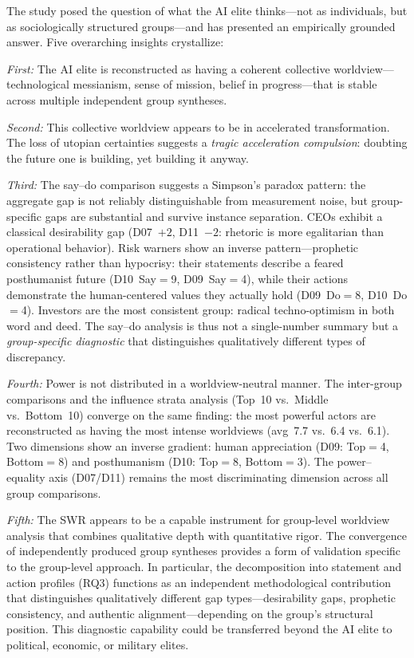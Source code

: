 \documentclass[12pt,a4paper]{article}
\begin{document}
The study posed the question of what the AI elite thinks---not as individuals, but as sociologically structured groups---and has presented an empirically grounded answer. Five overarching insights crystallize:

\emph{First:} The AI elite is reconstructed as having a coherent collective worldview---technological messianism, sense of mission, belief in progress---that is stable across multiple independent group syntheses.

\emph{Second:} This collective worldview appears to be in accelerated transformation. The loss of utopian certainties suggests a \emph{tragic acceleration compulsion}: doubting the future one is building, yet building it anyway.

\emph{Third:} The say--do comparison suggests a Simpson's paradox pattern: the aggregate gap is not reliably distinguishable from measurement noise, but group-specific gaps are substantial and survive instance separation. CEOs exhibit a classical desirability gap (D07~$+2$, D11~$-2$: rhetoric is more egalitarian than operational behavior). Risk warners show an inverse pattern---prophetic consistency rather than hypocrisy: their statements describe a feared posthumanist future (D10~Say$=$9, D09~Say$=$4), while their actions demonstrate the human-centered values they actually hold (D09~Do$=$8, D10~Do$=$4). Investors are the most consistent group: radical techno-optimism in both word and deed. The say--do analysis is thus not a single-number summary but a \emph{group-specific diagnostic} that distinguishes qualitatively different types of discrepancy.

\emph{Fourth:} Power is not distributed in a worldview-neutral manner. The inter-group comparisons and the influence strata analysis (Top~10 vs.\ Middle vs.\ Bottom~10) converge on the same finding: the most powerful actors are reconstructed as having the most intense worldviews (avg~7.7 vs.\ 6.4 vs.\ 6.1). Two dimensions show an inverse gradient: human appreciation (D09: Top$=$4, Bottom$=$8) and posthumanism (D10: Top$=$8, Bottom$=$3). The power--equality axis (D07/D11) remains the most discriminating dimension across all group comparisons.

\emph{Fifth:} The SWR appears to be a capable instrument for group-level worldview analysis that combines qualitative depth with quantitative rigor. The convergence of independently produced group syntheses provides a form of validation specific to the group-level approach. In particular, the decomposition into statement and action profiles (RQ3) functions as an independent methodological contribution that distinguishes qualitatively different gap types---desirability gaps, prophetic consistency, and authentic alignment---depending on the group's structural position. This diagnostic capability could be transferred beyond the AI elite to political, economic, or military elites.
\end{document}
